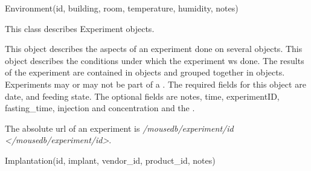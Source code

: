 \documentclass[letterpaper,10pt,english]{sphinxmanual}
\begin{document}
\begin{fulllineitems}
\label{data:mousedb.data.models.Environment}
Environment(id, building, room, temperature, humidity, notes)

\end{fulllineitems}


\begin{fulllineitems}
\label{data:mousedb.data.models.Experiment}
This class describes Experiment objects.

This object describes the aspects of an experiment done on several {\hyperref[animals:mousedb.animal.models.Animal]{}} objects.
This object describes the conditions under which the experiment ws done.
The results of the experiment are contained in  objects and grouped together in  objects.
Experiments may or may not be part of a .
The required fields for this object are date,  and feeding state.
The optional fields are notes, time, experimentID, fasting\_time, injection and concentration and the .

\begin{fulllineitems}
\label{data:mousedb.data.models.Experiment.get_absolute_url}
The absolute url of an experiment is  \emph{/mousedb/experiment/id \textless{}/mousedb/experiment/id\textgreater{}}.

\end{fulllineitems}


\end{fulllineitems}


\begin{fulllineitems}
\label{data:mousedb.data.models.Implantation}
Implantation(id, implant, vendor\_id, product\_id, notes)

\end{fulllineitems}
\end{document}

